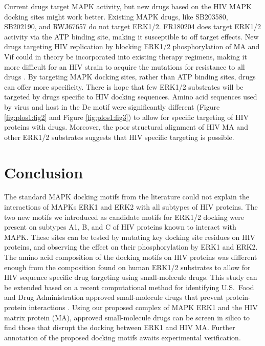 Current drugs target MAPK activity, but new drugs based on the HIV
MAPK docking sites might work better. Existing MAPK drugs, like
SB203580, SB202190, and RWJ67657 do not target ERK1/2. FR180204 does
target ERK1/2 activity via the ATP binding site, making it susceptible
to off target effects. New drugs targeting HIV replication by blocking
ERK1/2 phosphorylation of MA and Vif could in theory be incorporated
into existing therapy regimens, making it more difficult for an HIV
strain to acquire the mutations for resistance to all drugs
\cite{deeks03}. By targeting MAPK docking sites, rather than ATP
binding sites, drugs can offer more specificity. There is hope that
few ERK1/2 substrates will be targeted by drugs specific to HIV
docking sequences. Amino acid sequences used by virus and host in the
Dc motif were significantly different (Figure \ref{fig:plos1:fig2} and
Figure \ref{fig:plos1:fig3}) to allow for specific targeting of HIV
proteins with drugs. Moreover, the poor structural alignment of HIV MA
and other ERK1/2 substrates suggests that HIV specific targeting is
possible.

\section{Conclusion}

The standard MAPK docking motifs from the literature could not explain
the interactions of MAPKs ERK1 and ERK2 with all subtypes of HIV
proteins. The two new motifs we introduced as candidate motifs for
ERK1/2 docking were present on subtypes A1, B, and C of HIV proteins
known to interact with MAPK. These sites can be tested by mutating key
docking site residues on HIV proteins, and observing the effect on
their phosphorylation by ERK1 and ERK2. The amino acid composition of
the docking motifs on HIV proteins was different enough from the
composition found on human ERK1/2 substrates to allow for HIV sequence
specific drug targeting using small-molecule drugs. This study can be
extended based on a recent computational method for identifying
U.S.\ Food and Drug Administration approved small-molecule drugs that
prevent protein-protein interactions
\cite{parthasarathi2008approved}. Using our proposed complex of MAPK
ERK1 and the HIV matrix protein (MA), approved small-molecule drugs
can be screen in silico to find those that disrupt the docking between
ERK1 and HIV MA. Further annotation of the proposed docking motifs
awaits experimental verification.

